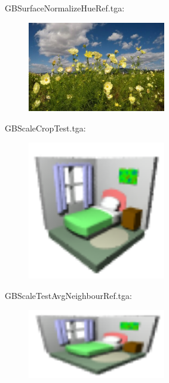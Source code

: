 GBSurfaceNormalizeHueRef.tga:\\
\begin{center}
\begin{figure}[H]
\centering\includegraphics[width=6cm]{./GBSurfaceNormalizeHueRef.png}\\
\end{figure}
\end{center}

GBScaleCropTest.tga:\\
\begin{center}
\begin{figure}[H]
\centering\includegraphics[width=6cm]{./GBScaleCropTest.png}\\
\end{figure}
\end{center}

GBScaleTestAvgNeighbourRef.tga:\\
\begin{center}
\begin{figure}[H]
\centering\includegraphics[width=6cm]{./GBScaleTestAvgNeighbourRef01.png}\\
\end{figure}
\end{center}

